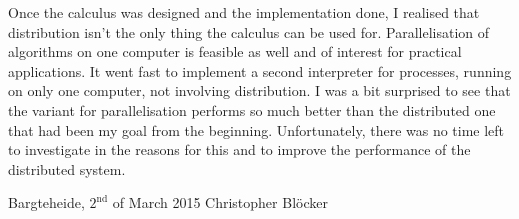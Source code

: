 Once the calculus was designed and the implementation done, I realised that distribution isn't the only thing the calculus can be used for. Parallelisation of algorithms on one computer is feasible as well and of interest for practical applications. It went fast to implement a second interpreter for processes, running on only one computer, not involving distribution. I was a bit surprised to see that the variant for parallelisation performs so much better than the distributed one that had been my goal from the beginning. Unfortunately, there was no time left to investigate in the reasons for this and to improve the performance of the distributed system.

\vfill

\noindent
Bargteheide, $2^\text{nd}$ of March 2015 \hfill Christopher Blöcker